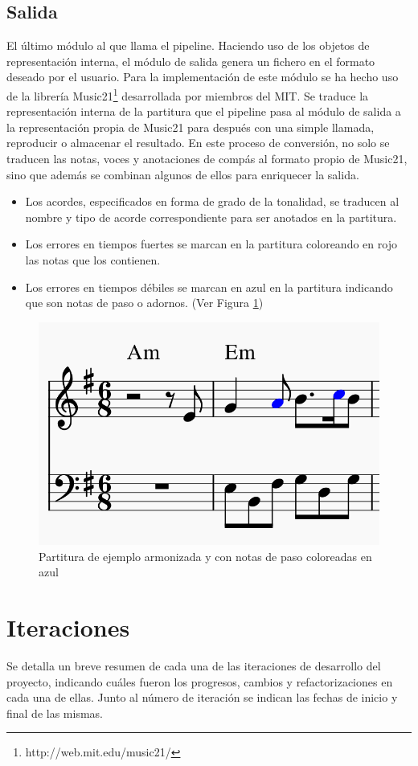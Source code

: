 \subsection{Salida}
El último módulo al que llama el pipeline. Haciendo uso de los objetos de representación interna, el módulo de salida genera un fichero en el formato deseado por el usuario. 
Para la implementación de este módulo se ha hecho uso de la librería Music21\footnote{http://web.mit.edu/music21/} desarrollada por miembros del MIT. Se traduce la representación interna de la partitura que el pipeline pasa al módulo de salida a la representación propia de Music21 para después con una simple llamada, reproducir o almacenar el resultado.
En este proceso de conversión, no solo se traducen las notas, voces y anotaciones de compás al formato propio de Music21, sino que además se combinan algunos de ellos para enriquecer la salida.
\begin{itemize}
	\item Los acordes, especificados en forma de grado de la tonalidad, se traducen al nombre y tipo de acorde correspondiente para ser anotados en la partitura.
	\item Los errores en tiempos fuertes se marcan en la partitura coloreando en rojo las notas que los contienen.
	\item Los errores en tiempos débiles se marcan en azul en la partitura indicando que son notas de paso o adornos. (Ver Figura \ref{fig:simple-piece-final})
\end{itemize}

\begin{figure}[h]
	\centering
	\includegraphics[width=0.4\linewidth]{imagenes/example_final_score.png}
	\caption{Partitura de ejemplo armonizada y con notas de paso coloreadas en azul}
	\label{fig:simple-piece-final}
\end{figure}


\section{Iteraciones}
Se detalla un breve resumen de cada una de las iteraciones de desarrollo del proyecto, indicando cuáles fueron los progresos, cambios y refactorizaciones en cada una de ellas. Junto al número de iteración se indican las fechas de inicio y final de las mismas.

